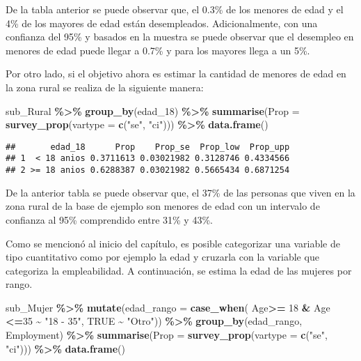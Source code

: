 \documentclass[
  12pt,
]{book}
\newenvironment{Shaded}{\begin{snugshade}}{\end{snugshade}}
\newcommand{\AttributeTok}[1]{\textcolor[rgb]{0.13,0.29,0.53}{#1}}
\newcommand{\ConstantTok}[1]{\textcolor[rgb]{0.56,0.35,0.01}{#1}}
\newcommand{\DecValTok}[1]{\textcolor[rgb]{0.00,0.00,0.81}{#1}}
\newcommand{\FunctionTok}[1]{\textcolor[rgb]{0.13,0.29,0.53}{\textbf{#1}}}
\newcommand{\NormalTok}[1]{#1}
\newcommand{\SpecialCharTok}[1]{\textcolor[rgb]{0.81,0.36,0.00}{\textbf{#1}}}
\newcommand{\StringTok}[1]{\textcolor[rgb]{0.31,0.60,0.02}{#1}}
\begin{document}
De la tabla anterior se puede observar que, el 0.3\% de los menores de edad y el 4\% de los mayores de edad están desempleados. Adicionalmente, con una confianza del 95\% y basados en la muestra se puede observar que el desempleo en menores de edad puede llegar a 0.7\% y para los mayores llega a un 5\%.

Por otro lado, si el objetivo ahora es estimar la cantidad de menores de edad en la zona rural se realiza de la siguiente manera:

\begin{Shaded}
\begin{Highlighting}[]
\NormalTok{sub\_Rural }\SpecialCharTok{\%\textgreater{}\%} \FunctionTok{group\_by}\NormalTok{(edad\_18) }\SpecialCharTok{\%\textgreater{}\%} 
              \FunctionTok{summarise}\NormalTok{(}\AttributeTok{Prop =} \FunctionTok{survey\_prop}\NormalTok{(}\AttributeTok{vartype =}  \FunctionTok{c}\NormalTok{(}\StringTok{"se"}\NormalTok{, }\StringTok{"ci"}\NormalTok{))) }\SpecialCharTok{\%\textgreater{}\%}
              \FunctionTok{data.frame}\NormalTok{()}
\end{Highlighting}
\end{Shaded}

\begin{verbatim}
##       edad_18      Prop    Prop_se  Prop_low  Prop_upp
## 1  < 18 anios 0.3711613 0.03021982 0.3128746 0.4334566
## 2 >= 18 anios 0.6288387 0.03021982 0.5665434 0.6871254
\end{verbatim}

De la anterior tabla se puede observar que, el 37\% de las personas que viven en la zona rural de la base de ejemplo son menores de edad con un intervalo de confianza al 95\% comprendido entre 31\% y 43\%.

Como se mencionó al inicio del capítulo, es posible categorizar una variable de tipo cuantitativo como por ejemplo la edad y cruzarla con la variable que categoriza la empleabilidad. A continuación, se estima la edad de las mujeres por rango.

\begin{Shaded}
\begin{Highlighting}[]
\NormalTok{sub\_Mujer }\SpecialCharTok{\%\textgreater{}\%} \FunctionTok{mutate}\NormalTok{(}\AttributeTok{edad\_rango =} \FunctionTok{case\_when}\NormalTok{(}
\NormalTok{                     Age}\SpecialCharTok{\textgreater{}=} \DecValTok{18} \SpecialCharTok{\&}\NormalTok{ Age }\SpecialCharTok{\textless{}=}\DecValTok{35}  \SpecialCharTok{\textasciitilde{}} \StringTok{"18 {-} 35"}\NormalTok{, }\ConstantTok{TRUE} \SpecialCharTok{\textasciitilde{}} \StringTok{"Otro"}\NormalTok{)) }\SpecialCharTok{\%\textgreater{}\%}
                     \FunctionTok{group\_by}\NormalTok{(edad\_rango, Employment) }\SpecialCharTok{\%\textgreater{}\%} 
                     \FunctionTok{summarise}\NormalTok{(}\AttributeTok{Prop =} \FunctionTok{survey\_prop}\NormalTok{(}\AttributeTok{vartype =}  \FunctionTok{c}\NormalTok{(}\StringTok{"se"}\NormalTok{, }\StringTok{"ci"}\NormalTok{))) }\SpecialCharTok{\%\textgreater{}\%} 
                     \FunctionTok{data.frame}\NormalTok{()}
\end{Highlighting}
\end{Shaded}
\end{document}

